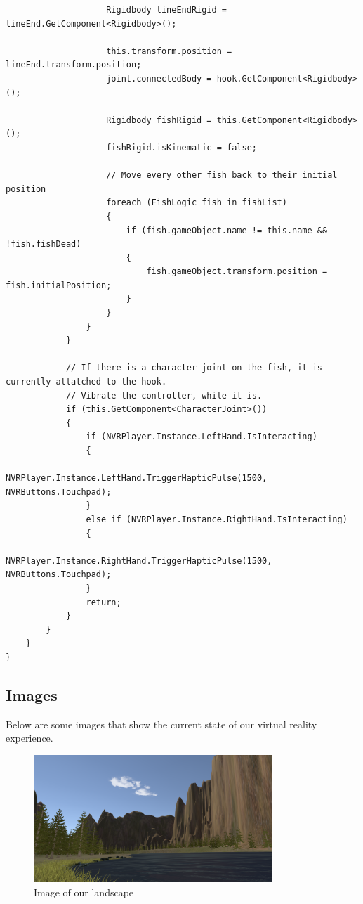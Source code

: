 \documentclass[10pt,journal,compsoc,onecolumn, draftclsnofoot]{IEEEtran}
\begin{document}
\begin{verbatim}
                    Rigidbody lineEndRigid = lineEnd.GetComponent<Rigidbody>();

                    this.transform.position = lineEnd.transform.position;
                    joint.connectedBody = hook.GetComponent<Rigidbody>();

                    Rigidbody fishRigid = this.GetComponent<Rigidbody>();
                    fishRigid.isKinematic = false;

                    // Move every other fish back to their initial position
                    foreach (FishLogic fish in fishList)
                    {
                        if (fish.gameObject.name != this.name && !fish.fishDead)
                        {
                            fish.gameObject.transform.position = fish.initialPosition;
                        }
                    }
                }
            }

            // If there is a character joint on the fish, it is currently attatched to the hook.
            // Vibrate the controller, while it is.
            if (this.GetComponent<CharacterJoint>())
            {
                if (NVRPlayer.Instance.LeftHand.IsInteracting)
                {
                    NVRPlayer.Instance.LeftHand.TriggerHapticPulse(1500, NVRButtons.Touchpad);
                }
                else if (NVRPlayer.Instance.RightHand.IsInteracting)
                {
                    NVRPlayer.Instance.RightHand.TriggerHapticPulse(1500, NVRButtons.Touchpad);
                }
                return;
            }
        }
    }
}
\end{verbatim}

\subsection{Images}
Below are some images that show the current state of our virtual reality experience.

\vspace{1cm}

\begin{figure}[h]
    \centering
    \includegraphics[width=0.80\textwidth]{waterLeft.png}
    \caption{Image of our landscape}
\end{figure}
\end{document}
